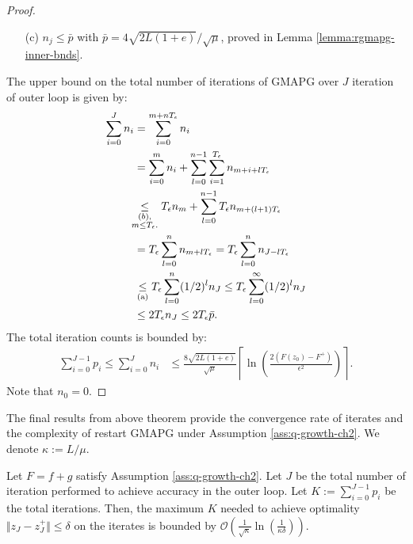 \documentclass[12pt]{report}
\begin{document}
\begin{proof}
\begin{enumerate}
                \item [(c)] $n_j \le \bar p$ with $\bar p = 4\sqrt{2L(1 + e)}/\sqrt{\mu}$, proved in Lemma \ref{lemma:rgmapg-inner-bnds}. 
            \end{enumerate}
            The upper bound on the total number of iterations of GMAPG over $J$ iteration of outer loop is given by: 
            \begin{align*}
                \sum_{i = 0}^{J} n_i &= \sum_{i = 0}^{m + nT_\epsilon} n_i
                \\
                &= \sum_{i = 0}^{m}n_i + \sum_{l = 0}^{n - 1}\sum_{i = 1}^{T_\epsilon} n_{m + i + lT_\epsilon}
                \\
                &\hspace{-0.5em}
                \underset{\substack{(b), \\ m \le T_\epsilon.}}\le T_\epsilon n_m + \sum_{l = 0}^{n - 1} T_\epsilon n_{m + (l + 1)T_\epsilon}
                \\
                &= T_\epsilon \sum_{l = 0}^{n} n_{m + lT_\epsilon} = T_\epsilon \sum_{l = 0}^{n} n_{J - lT_\epsilon}
                \\
                &\underset{\text{(a)}}{\le} T_\epsilon \sum_{l = 0}^{n} (1/2)^l n_J \le T_\epsilon \sum_{l = 0}^{\infty} (1/2)^l n_J
                \\
                &\le 2T_\epsilon n_J \le 2T_\epsilon \bar p.
            \end{align*}
            The total iteration counts is bounded by: 
            \begin{align*}
                \sum_{i = 0}^{J - 1}p_i \le \sum_{i = 0}^{J} n_i &\le 
                \frac{8\sqrt{2L(1 + e)}}{\sqrt{\mu}} \left\lceil 
                \ln \left(
                    \frac{2(F(z_0) - F^+)}{\epsilon^2}
                \right) 
                \right\rceil. 
            \end{align*}
            Note that $n_0 = 0$. 
        \end{proof}
        \par
        The final results from above theorem provide the convergence rate of iterates and the complexity of restart GMAPG under Assumption \ref{ass:q-growth-ch2}. 
        We denote $\kappa := L/\mu$. 
        \begin{theorem}\;\label{thm:rgmapg-cnvg-complexity}
            Let $F = f + g$ satisfy Assumption \ref{ass:q-growth-ch2}. 
            Let $J$ be the total number of iteration performed to achieve accuracy in the outer loop.
            Let $K := \sum_{i = 0}^{J - 1}p_i$ be the total iterations. 
            Then, the maximum $K$ needed to achieve optimality $\Vert z_J - z_J^+\Vert \le \delta$ on the iterates is bounded by $\mathcal O\left(\frac{1}{\sqrt{\kappa}}\ln\left(\frac{1}{\kappa\delta}\right)\right)$. 
        \end{theorem}
\end{document}
